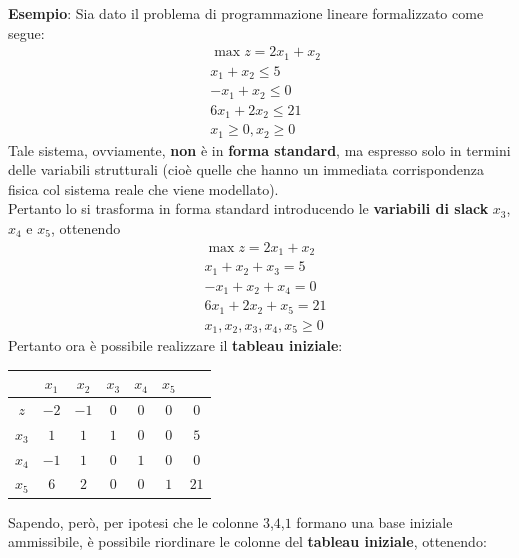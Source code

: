\documentclass[a4paper]{extarticle}
\renewcommand\arraystretch{}
\begin{document}
\vspace{1em}
\noindent
\textbf{Esempio}: Sia dato il problema di programmazione lineare formalizzato come segue:
\begin{align*}
    &\max z = 2x_1 + x_2\\
    &x_1+x_2 \leq 5\\
    &-x_1+x_2 \leq 0\\
    &6x_1+2x_2 \leq 21\\
    &x_1 \geq 0, x_2 \geq 0
\end{align*}
Tale sistema, ovviamente, \textbf{non} è in \textbf{forma standard}, ma espresso solo in termini delle variabili strutturali (cioè quelle che hanno un immediata corrispondenza fisica col sistema reale che viene modellato).\\
Pertanto lo si trasforma in forma standard introducendo le \textbf{variabili di slack} $x_3$, $x_4$ e $x_5$, ottenendo
\begin{align*}
    &\max z = 2 x_1 + x_2\\
    &x_1+x_2+x_3=5\\
    &-x_1+x_2+x_4=0\\
    &6x_1 + 2x_2+x_5=21\\
    &x_1,x_2,x_3,x_4,x_5 \geq 0
\end{align*}
Pertanto ora è possibile realizzare il \textbf{tableau iniziale}:

\vspace{1em}
\noindent
\begin{table}[H]
    \setlength{\tabcolsep}{4pt}
    \renewcommand{\arraystretch}{1.2}
    \noindent
    \centering
    \begin{tabular}{|c|ccccc|c|}
        & $x_1$ & $x_2$ & $x_3$ & $x_4$ & $x_5$ &\\
        \hline
        $z$ & $-2$ & $-1$ & $0$ & $0$ & $0$ & $0$\\
        \hline
        $x_3$ & $1$ & $1$ & $1$ & $0$ & $0$ & $5$\\
        $x_4$ & $-1$ & $1$ & $0$ & $1$ & $0$ & $0$\\
        $x_5$ & $6$ & $2$ & $0$ & $0$ & $1$ & $21$\\
        \hline
    \end{tabular}
\end{table}   

\vspace{1em}
\noindent
Sapendo, però, per ipotesi che le colonne $3$,$4$,$1$ formano una base iniziale ammissibile, è possibile riordinare le colonne del \textbf{tableau iniziale}, ottenendo:
\end{document}
